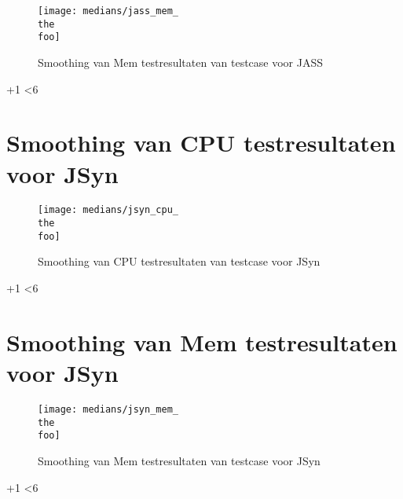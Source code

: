\loop
    
    \begin{figure}
    		\centering
    		\texttt{[image: medians/jass\_mem\_\\the\\foo]}
    		\caption{Smoothing van Mem testresultaten van testcase \the\foo  voor JASS}
    \end{figure}
  
  \advance \foo +1
\ifnum \foo<6
\repeat

\section{Smoothing van CPU testresultaten voor JSyn}

\loop
    
    \begin{figure}
    		\centering
    		\texttt{[image: medians/jsyn\_cpu\_\\the\\foo]}
    		\caption{Smoothing van CPU testresultaten van testcase \the\foo  voor JSyn}
    \end{figure}
  
  \advance \foo +1
\ifnum \foo<6
\repeat

\section{Smoothing van Mem testresultaten voor JSyn}

\loop
    
    \begin{figure}
    		\centering
    		\texttt{[image: medians/jsyn\_mem\_\\the\\foo]}
    		\caption{Smoothing van Mem testresultaten van testcase \the\foo  voor JSyn}
    \end{figure}
  
  \advance \foo +1
\ifnum \foo<6
\repeat
